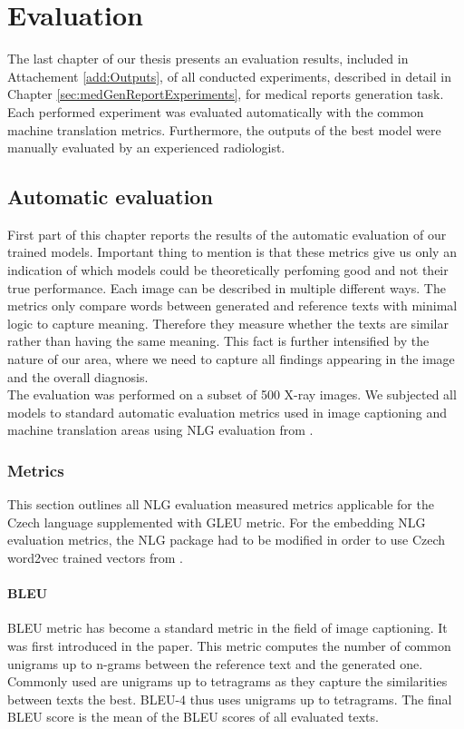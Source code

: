 \chapter{Evaluation}
The last chapter of our thesis presents an evaluation results, included in Attachement \ref{add:Outputs}, of all conducted experiments, described in detail in Chapter \ref{sec:medGenReportExperiments}, for medical reports generation task. Each performed experiment was evaluated automatically with the common machine translation metrics. Furthermore, the outputs of the best model were manually evaluated by an experienced radiologist.

\section{Automatic evaluation}
First part of this chapter reports the results of the automatic evaluation of our trained models. Important thing to mention is that these metrics give us only an indication of which models could be theoretically perfoming good and not their true performance. Each image can be described in multiple different ways. The metrics only compare words between generated and reference texts with minimal logic to capture meaning. Therefore they measure whether the texts are similar rather than having the same meaning. This fact is further intensified by the nature of our area, where we need to capture all findings appearing in the image and the overall diagnosis. \\

The evaluation was performed on a subset of 500 X-ray images. We subjected all models to standard automatic evaluation metrics used in image captioning and machine translation areas using NLG evaluation from \citet{sharma2017nlgeval}.

\subsection{Metrics}
This section outlines all NLG evaluation measured metrics applicable for the Czech language supplemented with GLEU metric. For the embedding NLG evaluation metrics, the NLG package had to be modified in order to use Czech word2vec trained vectors from \citet{grave2018learning}.

\subsubsection*{BLEU}
BLEU metric has become a standard metric in the field of image captioning. It was first introduced in the \citet{papineni2002bleu} paper. This metric computes the number of common unigrams up to n-grams between the reference text and the generated one. Commonly used are unigrams up to tetragrams as they capture the similarities between texts the best. BLEU-4 thus uses unigrams up to tetragrams. The final BLEU score is the mean of the BLEU scores of all evaluated texts.

